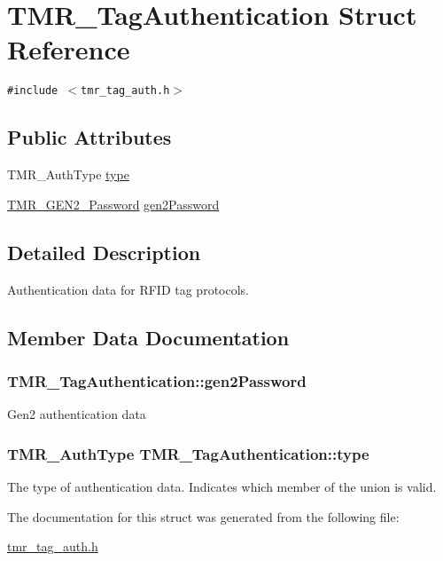 \hypertarget{struct_t_m_r___tag_authentication}{
\section{TMR\_\-TagAuthentication Struct Reference}
\label{struct_t_m_r___tag_authentication}
}
{\tt \#include $<$tmr\_\-tag\_\-auth.h$>$}

\subsection*{Public Attributes}
\begin{CompactItemize}
\item 
TMR\_\-AuthType \hyperlink{struct_t_m_r___tag_authentication_8a846f4456dd4d5bcc342fdedadcc8a4}{type}
\item 
\hyperlink{tmr__gen2_8h_75cb57ee85289b5746c4006a8e66e261}{TMR\_\-GEN2\_\-Password} \hyperlink{struct_t_m_r___tag_authentication_ad5e673054b0357795e14e102f2e5ea9}{gen2Password}
\end{CompactItemize}


\subsection{Detailed Description}
Authentication data for RFID tag protocols. 

\subsection{Member Data Documentation}
\hypertarget{struct_t_m_r___tag_authentication_ad5e673054b0357795e14e102f2e5ea9}{
\subsubsection[{gen2Password}]{ {\bf TMR\_\-TagAuthentication::gen2Password}}}
\label{struct_t_m_r___tag_authentication_ad5e673054b0357795e14e102f2e5ea9}


Gen2 authentication data \hypertarget{struct_t_m_r___tag_authentication_8a846f4456dd4d5bcc342fdedadcc8a4}{
\subsubsection[{type}]{\setlength{\rightskip}{0pt plus 5cm}TMR\_\-AuthType {\bf TMR\_\-TagAuthentication::type}}}
\label{struct_t_m_r___tag_authentication_8a846f4456dd4d5bcc342fdedadcc8a4}


The type of authentication data. Indicates which member of the union is valid. 

The documentation for this struct was generated from the following file:\begin{CompactItemize}
\item 
\hyperlink{tmr__tag__auth_8h}{tmr\_\-tag\_\-auth.h}\end{CompactItemize}
